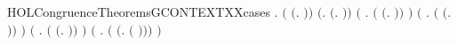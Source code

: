 \begin{SaveVerbatim}{HOLCongruenceTheoremsGCONTEXTXXcases}
\HOLTokenTurnstile{} \HOLSymConst{\HOLTokenForall{}}.
         \HOLSymConst{\HOLTokenEquiv{}}
       \ensuremath{(} \HOLSymConst{\ensuremath{=}} \ensuremath{(}\HOLTokenLambda{}. \ensuremath{)}\ensuremath{)} \HOLSymConst{\HOLTokenDisj{}} \ensuremath{(}\HOLSymConst{\HOLTokenExists{}}.  \HOLSymConst{\ensuremath{=}} \ensuremath{(}\HOLTokenLambda{}. \ensuremath{)}\ensuremath{)} \HOLSymConst{\HOLTokenDisj{}}
       \ensuremath{(}\HOLSymConst{\HOLTokenExists{}} . \ensuremath{(} \HOLSymConst{\ensuremath{=}} \ensuremath{(}\HOLTokenLambda{}. \HOLSymConst{\ensuremath{\ldotp}} \ensuremath{)}\ensuremath{)} \HOLSymConst{\HOLTokenConj{}}  \ensuremath{)} \HOLSymConst{\HOLTokenDisj{}}
       \ensuremath{(}\HOLSymConst{\HOLTokenExists{}}   .
            \ensuremath{(} \HOLSymConst{\ensuremath{=}} \ensuremath{(}\HOLTokenLambda{}. \HOLSymConst{\ensuremath{\ldotp}}  \HOLSymConst{\ensuremath{+}} \HOLSymConst{\ensuremath{\ldotp}} \ensuremath{)}\ensuremath{)} \HOLSymConst{\HOLTokenConj{}}   \HOLSymConst{\HOLTokenConj{}}
             \ensuremath{)} \HOLSymConst{\HOLTokenDisj{}}
       \ensuremath{(}\HOLSymConst{\HOLTokenExists{}} .
            \ensuremath{(} \HOLSymConst{\ensuremath{=}} \ensuremath{(}\HOLTokenLambda{}.   \HOLSymConst{\ensuremath{\mid}}  \ensuremath{)}\ensuremath{)} \HOLSymConst{\HOLTokenConj{}}   \HOLSymConst{\HOLTokenConj{}}  \ensuremath{)} \HOLSymConst{\HOLTokenDisj{}}
       \ensuremath{(}\HOLSymConst{\HOLTokenExists{}} . \ensuremath{(} \HOLSymConst{\ensuremath{=}} \ensuremath{(}\HOLTokenLambda{}.   \ensuremath{(} \ensuremath{)}\ensuremath{)}\ensuremath{)} \HOLSymConst{\HOLTokenConj{}}  \ensuremath{)} \HOLSymConst{\HOLTokenDisj{}}

\end{SaveVerbatim}
